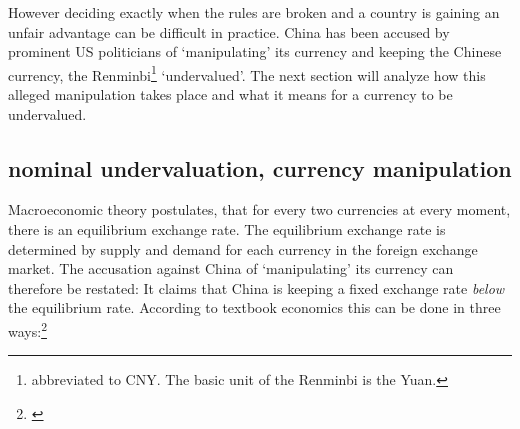 \documentclass[11pt]{article}
\begin{document}
However deciding exactly when the rules are broken and a country is 
gaining an unfair advantage can be difficult in practice. China has been 
accused by prominent US politicians of `manipulating' its currency and 
keeping the Chinese currency, the Renminbi\footnote{abbreviated to CNY. 
The basic unit of the Renminbi is the Yuan.} `undervalued'. The next 
section will analyze how this alleged manipulation takes place and what 
it means for a currency to be undervalued.





\subsection{nominal undervaluation, currency manipulation}

Macroeconomic theory postulates, that for every two currencies at every 
moment, there is an equilibrium exchange rate. The equilibrium exchange 
rate is determined by supply and demand for each currency in the foreign 
exchange market. The accusation against China of `manipulating' its 
currency can therefore be restated: It claims that China is keeping a 
fixed exchange rate \emph{below} the equilibrium rate. According to 
textbook economics this can be done in three ways:\footnote{\cite[pp. 
514]{Krugman2008}}
\end{document}
